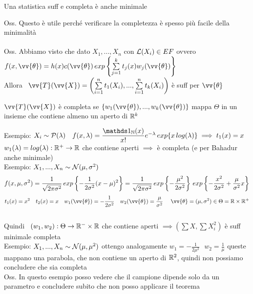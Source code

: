 
\begin{teo}[Bahadur]
Una statistica suff e completa è anche minimale
\end{teo}

Oss. Questo è utile perché verificare la completezza è spesso più facile della minimalità\\ \\

Oss. Abbiamo visto che dato $X_1,...,X_n$ con $\mathcal L(X_i)\in EF$ ovvero $f(x,\vv{\theta})= h(x) c(\vv{\theta})\, exp \OOO \Sum{j=1}{k} t_j(x)w_j(\vv{\theta}) \CCC$\\
Allora \ $\vv{T}( \vv{X})=\O \Sum{i=1}{n}t_1(X_i), ..., \Sum{i=1}{n}t_k(X_i)\C$ è suff per $\vv{\theta}$\\

\begin{teo}
$\vv{T}(\vv{X})$ è completa se $\{w_1(\vv{\theta}), ..., w_k(\vv{\theta})\}$ mappa $\Theta$ in un insieme che contiene almeno un aperto di $\mathbb R^k$
\end{teo}
\phantom{}

Esempio: $X_i\sim \Pc(\lambda) \ \ \ f(x,\lambda)= \frac{\II_{\NN}(x)}{x!} e^{-\lambda} \, exp\{ x\,log(\lambda)\} \implies t_1(x)=x$\\
$w_1(\lambda)=log(\lambda):\mathbb R^+\to\mathbb R$ che contiene aperti $ \implies$ è completa (e per Bahadur anche minimale)\\ 

Esempio: $X_1,...,X_n\sim \mathcal N(\mu,\sigma^2) $ 
\[f(x,\mu,\sigma^2)=\dfrac{1}{\sqrt{2\pi\sigma^2}} \, exp \left\{ -\dfrac{1}{2\sigma^2}(x-\mu)^2\right\} = \dfrac{1}{\sqrt{2\pi\sigma^2}}\, exp\left\{ -\dfrac{\mu^2}{2\sigma^2}\right\} \, exp \left\{ -\dfrac{x^2}{2\sigma^2} +\dfrac{\mu}{\sigma^2}x \right\} \]
\[t_1(x)=x^2 \ \ \ t_2(x)=x \ \ \ w_1(\vv{\theta})=-\frac{1}{2\sigma^2} \ \ \ w_2(\vv{\theta})=\frac{\mu}{\sigma^2} \ \ \ \ \vv{\theta}=(\mu,\sigma^2)\in \Theta=\R\times\R^+\] \\
Quindi \ $(w_1,w_2):\Theta\to\mathbb R^-\times\mathbb R$ che contiene aperti $\implies (\sum X, \sum X_i^2)$ è suff minimale completa\\

Esempio: $X_1,...,X_n\sim\mathcal N(\mu,\mu^2)$ ottengo analogamente $w_1=-\frac{1}{2\mu^2} \ \ \ w_2=\frac{1}{\mu}$ queste mappano una parabola, che non contiene un aperto di $\mathbb R^2$, quindi non possiamo concludere che sia completa\\

Oss. In questo esempio posso vedere che il campione dipende solo da un parametro e concludere subito che non posso applicare il teorema \\ \\


